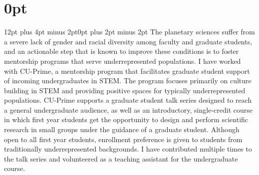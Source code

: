 \documentclass[12pt]{article}
\author{}
\date{}
\begin{document}
\pagestyle{fancy}
\thispagestyle{fancy}
\fancyhf{} %
\fancyhead[L]{\textcolor{red}{Tobias Oliver\\
Contributions Towards Building a Diverse and Inclusive Field}}
\fancyfoot[R]{\thepage}
\titlespacing\section{0pt}{12pt plus 4pt minus 2pt}{0pt plus 2pt minus 2pt}
The planetary sciences suffer from a severe lack of gender and racial diversity among faculty and graduate students\cite{kD20}, and an actionable step that is known to improve these conditions is to foster mentorship programs that serve underrepresented populations\cite{jH07}.
I have worked with CU-Prime, a mentorship program that facilitates graduate student support of incoming undergraduates in STEM. 
The program focuses primarily on culture building in STEM and providing positive spaces for typically underrepresented populations.
CU-Prime supports a graduate student talk series designed to reach a general undergraduate audience, as well as an introductory, single-credit course in which first year students get the opportunity to design and perform scientific research in small groups under the guidance of a graduate student. Although open to all first year students, enrollment preference is given to students from traditionally underrepresented backgrounds. 
I have contributed multiple times to the talk series and volunteered as a teaching assistant for the undergraduate course. 
\end{document}
